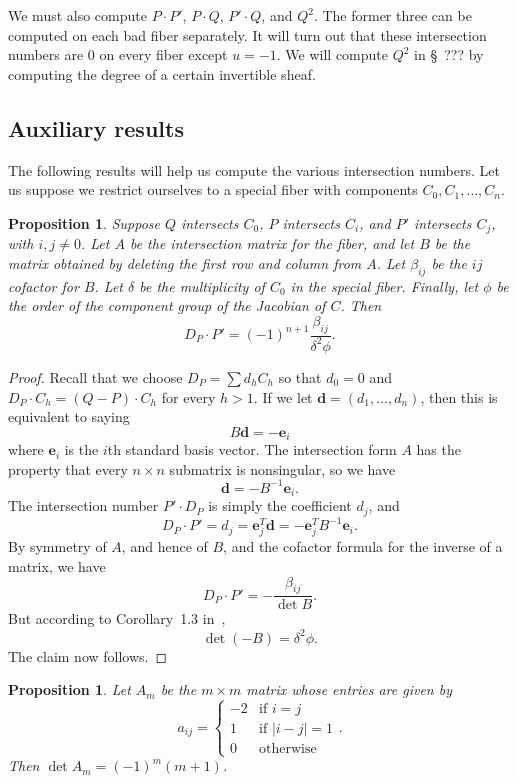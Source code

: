 \documentclass[reqno]{amsart}
\newtheorem{proposition}[thm]{Proposition}
\theoremstyle{definition}
\theoremstyle{remark}
\newcommand{\vd}{\mathbf{d}}
\newcommand{\ve}{\mathbf{e}}
\begin{document}
We must also compute $P \cdot P'$, $P \cdot Q$, $P' \cdot Q$, and $Q^2$. The former three can be computed on each bad fiber separately. It will turn out that these intersection numbers are 0 on every fiber except $u = -1$. We will compute $Q^2$ in \S~??? by computing the degree of a certain invertible sheaf.


\subsection{Auxiliary results}
\label{sec:auxiliary-results}

The following results will help us compute the various intersection numbers. Let us suppose we restrict ourselves to a special fiber with components $C_0, C_1, \dots, C_n$.

\begin{proposition}\label{prop:dp-dot-p-cofactor}
  Suppose $Q$ intersects $C_0$, $P$ intersects $C_i$, and $P'$ intersects $C_j$, with $i,j \neq 0$. Let $A$ be the intersection matrix for the fiber, and let $B$ be the matrix obtained by deleting the first row and column from $A$. Let $\beta_{ij}$ be the $ij$ cofactor for $B$. Let $\delta$ be the multiplicity of $C_0$ in the special fiber. Finally, let $\phi$ be the order of the component group of the Jacobian of $C$. Then
  \[
  D_P \cdot P' = (-1)^{n+1} \frac{\beta_{ij}}{\delta^2 \phi}.
  \]
\end{proposition}

\begin{proof}
  Recall that we choose $D_P = \sum d_h C_h$ so that $d_0 = 0$ and $D_P \cdot C_h = (Q - P) \cdot C_h$ for every $h > 1$. If we let $\vd = (d_1, \dots, d_n)$, then this is equivalent to saying
  \[
  B\vd = -\ve_i
  \]
  where $\ve_i$ is the $i$th standard basis vector. The intersection form $A$ has the property that every $n \times n$ submatrix is nonsingular, so we have
  \[
  \vd = -B^{-1}\ve_i.
  \]
  The intersection number $P' \cdot D_P$ is simply the coefficient $d_j$, and
  \[
  D_P \cdot P' = d_j = \ve_j^T \vd = -\ve_j^TB^{-1}\ve_i.
  \]
  By symmetry of $A$, and hence of $B$, and the cofactor formula for the inverse of a matrix, we have
  \[
  D_P \cdot P' = - \frac{\beta_{ij}}{\det B}.
  \]
  But according to Corollary~1.3 in~\cite{lorenzini},
  \[
  \det (-B) = \delta^2 \phi.
  \]
  The claim now follows.
\end{proof}

\begin{proposition}\label{prop:am-defn-det}
  Let $A_m$ be the $m \times m$ matrix whose entries are given by
  \[
  a_{ij} = \begin{cases}
    -2 & \text{if } i = j \\
    1 & \text{if } |i - j| = 1\\
    0 & \text{otherwise}
  \end{cases}.
  \]
  Then $\det A_m = (-1)^m (m+1)$.
\end{proposition}
\end{document}
